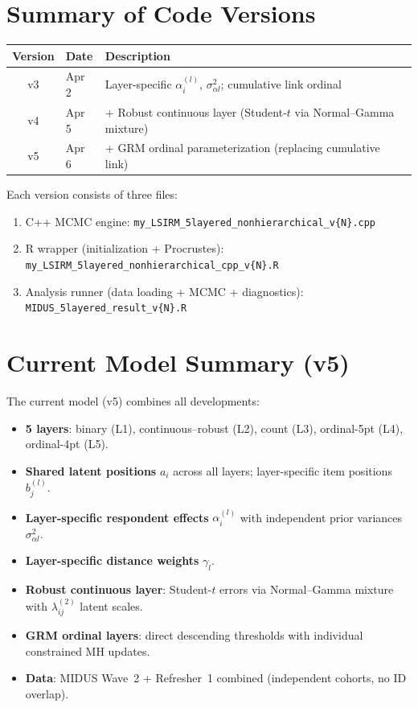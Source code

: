 \documentclass[11pt]{article}
\begin{document}
\section{Summary of Code Versions}

\begin{center}
\begin{tabular}{clp{8cm}}
\toprule
Version & Date & Description \\
\midrule
v3 & Apr 2 & Layer-specific $\alpha_i^{(l)}$, $\sigma_{\alpha l}^2$; cumulative link ordinal \\
v4 & Apr 5 & + Robust continuous layer (Student-$t$ via Normal--Gamma mixture) \\
v5 & Apr 6 & + GRM ordinal parameterization (replacing cumulative link) \\
\bottomrule
\end{tabular}
\end{center}

Each version consists of three files:
\begin{enumerate}[leftmargin=1.5em]
  \item C++ MCMC engine: \texttt{my\_LSIRM\_5layered\_nonhierarchical\_v\{N\}.cpp}
  \item R wrapper (initialization + Procrustes): \texttt{my\_LSIRM\_5layered\_nonhierarchical\_cpp\_v\{N\}.R}
  \item Analysis runner (data loading + MCMC + diagnostics): \texttt{MIDUS\_5layered\_result\_v\{N\}.R}
\end{enumerate}


\section{Current Model Summary (v5)}

The current model (v5) combines all developments:
\begin{itemize}[leftmargin=1.5em]
  \item \textbf{5 layers}: binary (L1), continuous--robust (L2), count (L3), ordinal-5pt (L4), ordinal-4pt (L5).
  \item \textbf{Shared latent positions} $a_i$ across all layers; layer-specific item positions $b_j^{(l)}$.
  \item \textbf{Layer-specific respondent effects} $\alpha_i^{(l)}$ with independent prior variances $\sigma_{\alpha l}^2$.
  \item \textbf{Layer-specific distance weights} $\gamma_l$.
  \item \textbf{Robust continuous layer}: Student-$t$ errors via Normal--Gamma mixture with $\lambda_{ij}^{(2)}$ latent scales.
  \item \textbf{GRM ordinal layers}: direct descending thresholds with individual constrained MH updates.
  \item \textbf{Data}: MIDUS Wave~2 + Refresher~1 combined (independent cohorts, no ID overlap).
\end{itemize}
\end{document}
